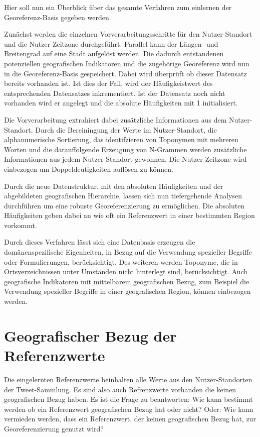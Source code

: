 			Hier soll nun ein Überblick über das gesamte Verfahren zum einlernen der Georeferenz-Basis gegeben werden.
		
			Zunächst werden die einzelnen Vorverarbeitungsschritte für den Nutzer-Standort und die Nutzer-Zeitzone durchgeführt.
			Parallel kann der Längen- und Breitengrad auf eine Stadt aufgelöst werden.
			Die dadurch entstandenen potenziellen geografischen Indikatoren und die zugehörige Georeferenz wird nun in die Georeferenz-Basis gespeichert. 
			Dabei wird überprüft ob dieser Datensatz bereits vorhanden ist. 
			Ist dies der Fall, wird der Häufigkeistwert des entsprechenden Datensatzes inkrementiert.
			Ist der Datensatz noch nicht vorhanden wird er angelegt und die absolute Häufigkeiten mit 1 initialisiert.

			Die Vorverarbeitung extrahiert dabei zusätzliche Informationen aus dem Nutzer-Standort.
			Durch die Bereiningung der Werte im Nutzer-Standort, die alphanumerische Sortierung, das identifzieren von Toponymen mit mehreren Worten und die darauffolgende Erzeugung von N-Grammen werden zusätzliche Informationen aus jedem Nutzer-Standort gewonnen.
			Die Nutzer-Zeitzone wird einbezogen um Doppeldeutigkeiten auflösen zu können.

			Durch die neue Datenstruktur, mit den absoluten Häufigkeiten und der abgebildeten geografischen Hierarchie, lassen sich nun tiefergehende Analysen durchführen um eine robuste Georeferenzierung zu ermöglichen. 
			Die absoluten Häufigkeiten geben dabei an wie oft ein Referenzwert in einer bestimmten Region vorkommt.

			Durch dieses Verfahren lässt sich eine Datenbasis erzeugen die domänenspezifische Eigenheiten, in Bezug auf die Verwendung spezieller Begriffe oder Formulierungen, berücksichtigt.
			Des weiteren werden Toponyme, die in Ortsverzeichnissen unter Umständen nicht hinterlegt sind, berücksichtigt.
			Auch geografische Indikatoren mit mittelbarem geografischen Bezug, zum Beispiel die Verwendung spezieller Begriffe in einer geografischen Region, können einbezogen werden. 

	\section{Geografischer Bezug der Referenzwerte}
			
		Die eingelernten Referenzwerte beinhalten alle Werte aus den Nutzer-Standorten der Tweet-Sammlung.
		Es sind also auch Refrenzwerte vorhanden die keinen geografischen Bezug haben.
		Es ist die Frage zu beantworten: Wie kann bestimmt werden ob ein Referenzwert geografischen Bezug hat oder nicht?
		Oder: Wie kann vermieden werden, dass ein Referenzwert, der keinen geografischen Bezug hat, zur Georeferenzierung genutzt wird?
		
